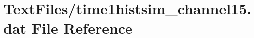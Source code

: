 \hypertarget{TextFiles_2time1histsim__channel15_8dat}{}\section{Text\+Files/time1histsim\+\_\+channel15.dat File Reference}
\label{TextFiles_2time1histsim__channel15_8dat}
